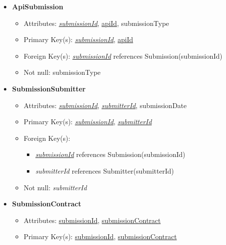 \begin{itemize}
        \item \textbf{ApiSubmission}
        \begin{itemize}
            \item Attributes: \underline{\textit{submissionId}}, \underline{apiId}, submissionType
            \item Primary Key(s): \underline{\textit{submissionId}}, \underline{apiId}
            \item Foreign Key(s): \underline{\textit{submissionId}} references Submission(submissionId)
            \item Not null: submissionType
        \end{itemize}

        \item \textbf{SubmissionSubmitter}
        \begin{itemize}
            \item Attributes: \underline{\textit{submissionId}}, \underline{\textit{submitterId}}, submissionDate
            \item Primary Key(s): \underline{\textit{submissionId}}, \underline{\textit{submitterId}}
            \item Foreign Key(s): 
            \begin{itemize}
                \item \underline{\textit{submissionId}} references Submission(submissionId)
                \item \textit{submitterId} references Submitter(submitterId)
            \end{itemize}
            \item Not null: \textit{submitterId}
        \end{itemize}

        \item \textbf{SubmissionContract}
        \begin{itemize}
            \item Attributes: \underline{submissionId}, \underline{submissionContract}
            \item Primary Key(s): \underline{submissionId}, \underline{submissionContract}
        \end{itemize}


\end{itemize}
